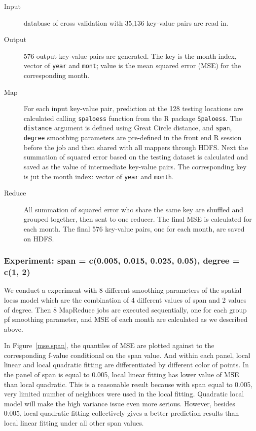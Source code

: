\begin{description}
  \item[Input] database of cross validation with 35,136 key-value pairs are read 
  in.
  \item[Output] 576 output key-value pairs are generated. The key is the month
  index, vector of \texttt{year} and \texttt{mont}; value is the mean squared
  error (MSE) for the corresponding month.
  \item[Map] For each input key-value pair, prediction at the 128 testing locations
  are calculated calling \texttt{spaloess} function from the R package 
  \texttt{Spaloess}. The \texttt{distance} argument is defined using Great Circle
  distance, and \texttt{span}, \texttt{degree} smoothing parameters are 
  pre-defined in the front end R session before the job and then shared with all
  mappers through HDFS. Next the summation of squared error based on the testing 
  dataset is calculated and saved as the value of intermediate key-value pairs. 
  The corresponding key is jut the month index: vector of \texttt{year} and 
  \texttt{month}.
  \item[Reduce] All summation of squared error who share the same key are shuffled 
  and grouped together, then sent to one reducer. The final MSE is calculated 
  for each month. The final 576 key-value pairs, one for each month, are saved 
  on HDFS.
\end{description}

\subsubsection{Experiment: span = c(0.005, 0.015, 0.025, 0.05), degree = c(1, 2)}

We conduct a experiment with 8 different smoothing parameters of the spatial loess
model which are the combination of 4 different values of span and 2 values of
degree. Then 8 MapReduce jobs are executed sequentially, one for each group pf 
smoothing parameter, and MSE of each month are calculated as we described above.

In Figure~\href{../plots/a1950/spafit/QuanMABSE.a1950.tmax.span.pdf}
{\ref*{mse.span}}, the quantiles of MSE are plotted against to the corresponding
f-value conditional on the span value. And within each panel, local linear and 
local quadratic fitting are differentiated by different color of points. In the 
panel of span is equal to 0.005, local linear fitting has lower value of MSE 
than local quadratic. This is a reasonable result because with span equal to 
0.005, very limited number of neighbors were used in the local fitting. Quadratic
local model will make the high variance issue even more serious. However, besides 
0.005, local quadratic fitting collectively gives a better prediction results 
than local linear fitting under all other span values.

